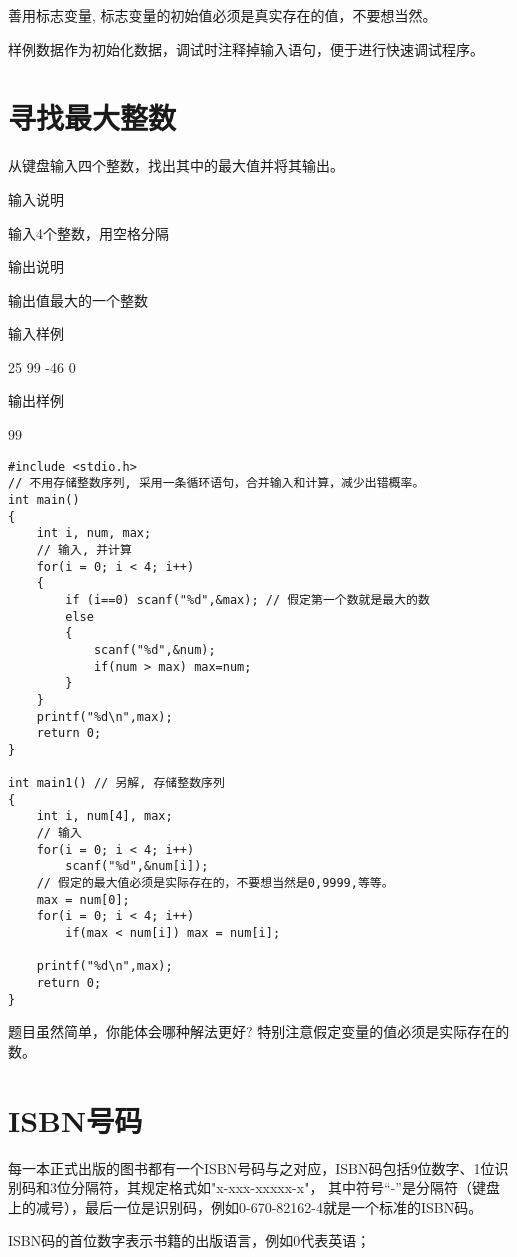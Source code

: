 \begin{note}[要点]
	善用标志变量, 标志变量的初始值必须是真实存在的值，不要想当然。
	
	样例数据作为初始化数据，调试时注释掉输入语句，便于进行快速调试程序。
\end{note}

\section{寻找最大整数}
从键盘输入四个整数，找出其中的最大值并将其输出。

输入说明

输入4个整数，用空格分隔

输出说明

输出值最大的一个整数

输入样例

25 99 -46 0

输出样例

99

\begin{lstlisting}
#include <stdio.h>
// 不用存储整数序列, 采用一条循环语句，合并输入和计算，减少出错概率。 
int main() 
{
	int i, num, max;
	// 输入, 并计算 
	for(i = 0; i < 4; i++) 
	{ 
		if (i==0) scanf("%d",&max); // 假定第一个数就是最大的数 
		else
		{
			scanf("%d",&num);
			if(num > max) max=num; 
		} 
	} 
	printf("%d\n",max);
	return 0;
} 

int main1() // 另解, 存储整数序列
{
	int i, num[4], max;
	// 输入 
	for(i = 0; i < 4; i++) 
		scanf("%d",&num[i]);
	// 假定的最大值必须是实际存在的，不要想当然是0,9999,等等。
	max = num[0]; 
	for(i = 0; i < 4; i++)  
		if(max < num[i]) max = num[i];
	
	printf("%d\n",max);
	return 0;
} 
\end{lstlisting}

\begin{note}[要点]
	题目虽然简单，你能体会哪种解法更好? 特别注意假定变量的值必须是实际存在的数。
\end{note}

\section{ISBN号码}
每一本正式出版的图书都有一个ISBN号码与之对应，ISBN码包括9位数字、1位识别码和3位分隔符，其规定格式如"x-xxx-xxxxx-x"，
其中符号“-”是分隔符（键盘上的减号），最后一位是识别码，例如0-670-82162-4就是一个标准的ISBN码。

ISBN码的首位数字表示书籍的出版语言，例如0代表英语；

